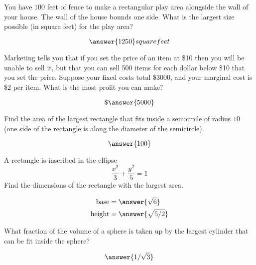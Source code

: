 \documentclass[handout]{ximera}
\begin{document}
\begin{exercise}
You have $100$ feet of fence to make a rectangular play area
  alongside the wall of your house.  The wall of the house bounds one
  side.  What is the largest size possible (in square feet) for the
  play area?

  \[
  \answer{1250} square feet
  \]

\end{exercise}


\begin{exercise}
Marketing tells you that if you set the price of an item at \$10
  then you will be unable to sell it, but that you can sell 500 items
  for each dollar below \$10 that you set the price.  Suppose your
  fixed costs total \$3000, and your marginal cost is \$2 per item.
  What is the most profit you can make?
  \begin{prompt}
  \[
  \$ \answer{5000}
  \]
  \end{prompt}
\end{exercise}

\begin{exercise}
Find the area of the largest rectangle that fits inside a semicircle
  of radius $10$ (one side of the rectangle is along the diameter of
  the semicircle).

  \[
  \answer{100}
  \]

\end{exercise}

\begin{exercise}
A rectangle is inscribed in the ellipse
  \[
  \frac{x^2}{3}+\frac{y^2}{5}=1
  \]
  Find the dimensions of the rectangle with the largest area.

  \begin{align*}
  \text{base} &= \answer{\sqrt{6}}\\
  \text{height} &= \answer{\sqrt{5/2}}
  \end{align*}

\end{exercise}

\begin{exercise}
What fraction of the volume of a sphere is taken up by the largest cylinder
  that can be fit inside the sphere?

  \[
  \answer{1/\sqrt{3}}
  \]

\end{exercise}
\end{document}

